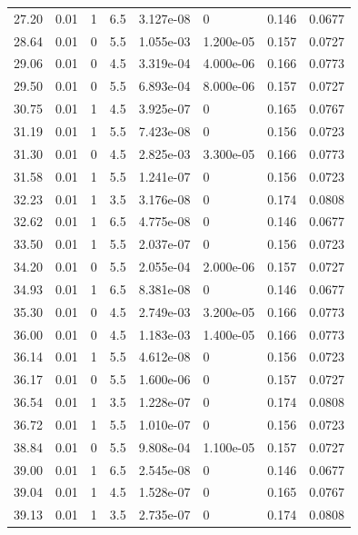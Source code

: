 \documentclass[preview]{standalone}
\begin{document}
{{{\begin{tabular}{L{1.2cm}C{1.2cm} C{0.3cm}C{0.5cm} C{1.4cm}C{1.4cm} C{1.4cm}C{1.4cm}}
  27.20  &  0.01  & 1     & 6.5 &  3.127e-08  & 0  & 0.146 &  0.0677   \\ 
  28.64  &  0.01  & 0     & 5.5 &  1.055e-03  & 1.200e-05  & 0.157 &  0.0727   \\ 
  29.06  &  0.01  & 0     & 4.5 &  3.319e-04  & 4.000e-06  & 0.166 &  0.0773   \\ 
  29.50  &  0.01  & 0     & 5.5 &  6.893e-04  & 8.000e-06  & 0.157 &  0.0727   \\ 
  30.75  &  0.01  & 1     & 4.5 &  3.925e-07  & 0  & 0.165 &  0.0767   \\ 
  31.19  &  0.01  & 1     & 5.5 &  7.423e-08  & 0  & 0.156 &  0.0723   \\ 
  31.30  &  0.01  & 0     & 4.5 &  2.825e-03  & 3.300e-05  & 0.166 &  0.0773   \\ 
  31.58  &  0.01  & 1     & 5.5 &  1.241e-07  & 0  & 0.156 &  0.0723   \\ 
  32.23  &  0.01  & 1     & 3.5 &  3.176e-08  & 0  & 0.174 &  0.0808   \\ 
  32.62  &  0.01  & 1     & 6.5 &  4.775e-08  & 0  & 0.146 &  0.0677   \\ 
  33.50  &  0.01  & 1     & 5.5 &  2.037e-07  & 0  & 0.156 &  0.0723   \\ 
  34.20  &  0.01  & 0     & 5.5 &  2.055e-04  & 2.000e-06  & 0.157 &  0.0727   \\ 
  34.93  &  0.01  & 1     & 6.5 &  8.381e-08  & 0  & 0.146 &  0.0677   \\ 
  35.30  &  0.01  & 0     & 4.5 &  2.749e-03  & 3.200e-05  & 0.166 &  0.0773   \\ 
  36.00  &  0.01  & 0     & 4.5 &  1.183e-03  & 1.400e-05  & 0.166 &  0.0773   \\ 
  36.14  &  0.01  & 1     & 5.5 &  4.612e-08  & 0  & 0.156 &  0.0723   \\ 
  36.17  &  0.01  & 0     & 5.5 &  1.600e-06  & 0  & 0.157 &  0.0727   \\ 
  36.54  &  0.01  & 1     & 3.5 &  1.228e-07  & 0  & 0.174 &  0.0808   \\ 
  36.72  &  0.01  & 1     & 5.5 &  1.010e-07  & 0  & 0.156 &  0.0723   \\ 
  38.84  &  0.01  & 0     & 5.5 &  9.808e-04  & 1.100e-05  & 0.157 &  0.0727   \\ 
  39.00  &  0.01  & 1     & 6.5 &  2.545e-08  & 0  & 0.146 &  0.0677   \\ 
  39.04  &  0.01  & 1     & 4.5 &  1.528e-07  & 0  & 0.165 &  0.0767   \\ 
  39.13  &  0.01  & 1     & 3.5 &  2.735e-07  & 0  & 0.174 &  0.0808   \\ 

\end{tabular}}}}
\end{document}
